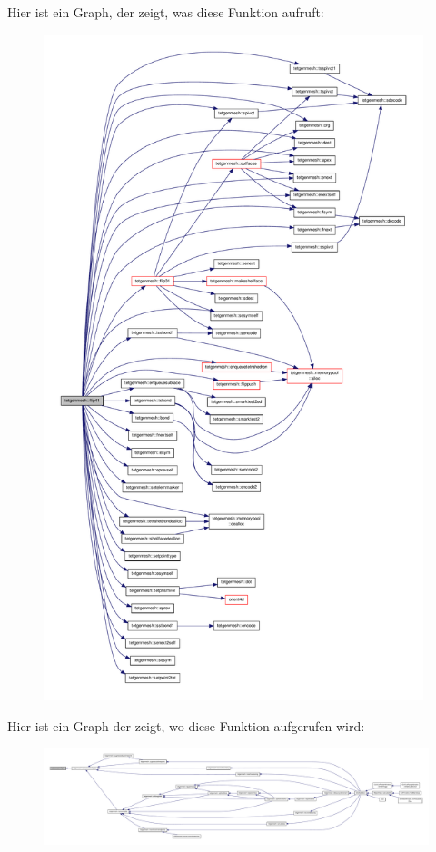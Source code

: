 Hier ist ein Graph, der zeigt, was diese Funktion aufruft\-:\nopagebreak
\begin{figure}[H]
\begin{center}
\leavevmode
\includegraphics[height=550pt]{classtetgenmesh_a061a1d2f047d12726215eac51c7bb5a1_cgraph}
\end{center}
\end{figure}




Hier ist ein Graph der zeigt, wo diese Funktion aufgerufen wird\-:\nopagebreak
\begin{figure}[H]
\begin{center}
\leavevmode
\includegraphics[width=350pt]{classtetgenmesh_a061a1d2f047d12726215eac51c7bb5a1_icgraph}
\end{center}
\end{figure}


